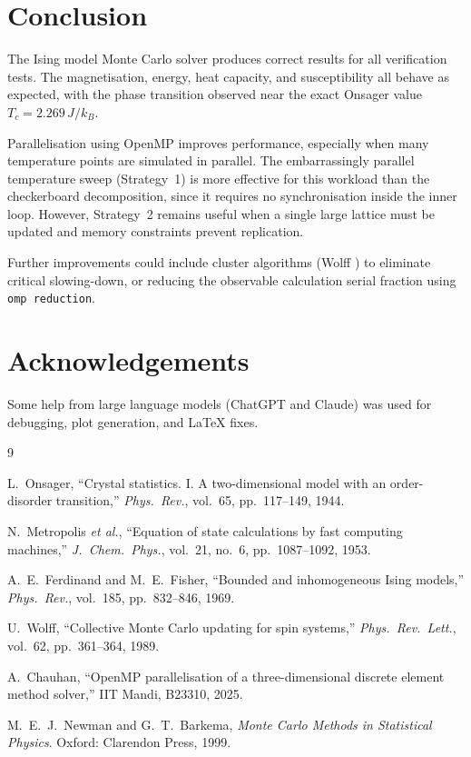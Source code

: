 \documentclass[conference]{IEEEtran}
\begin{document}
\section{Conclusion}

The Ising model Monte Carlo solver produces correct results for all
verification tests. The magnetisation, energy, heat capacity, and
susceptibility all behave as expected, with the phase transition observed
near the exact Onsager value $T_c = 2.269\,J/k_B$.

Parallelisation using OpenMP improves performance, especially when many
temperature points are simulated in parallel. The embarrassingly parallel
temperature sweep (Strategy~1) is more effective for this workload than
the checkerboard decomposition, since it requires no synchronisation inside
the inner loop. However, Strategy~2 remains useful when a single large
lattice must be updated and memory constraints prevent replication.

Further improvements could include cluster algorithms (Wolff
\cite{wolff1989}) to eliminate critical slowing-down, or reducing the
observable calculation serial fraction using \texttt{omp reduction}.

\section*{Acknowledgements}

Some help from large language models (ChatGPT and Claude) was used for
debugging, plot generation, and \LaTeX{} fixes.

\begin{thebibliography}{9}

L.~Onsager,
``Crystal statistics. I. A two-dimensional model with an order-disorder
transition,''
\emph{Phys.\ Rev.}, vol.~65, pp.~117--149, 1944.

N.~Metropolis \emph{et al.},
``Equation of state calculations by fast computing machines,''
\emph{J.\ Chem.\ Phys.}, vol.~21, no.~6, pp.~1087--1092, 1953.

A.~E.~Ferdinand and M.~E.~Fisher,
``Bounded and inhomogeneous Ising models,''
\emph{Phys.\ Rev.}, vol.~185, pp.~832--846, 1969.

U.~Wolff,
``Collective Monte Carlo updating for spin systems,''
\emph{Phys.\ Rev.\ Lett.}, vol.~62, pp.~361--364, 1989.

A.~Chauhan,
``OpenMP parallelisation of a three-dimensional discrete element method
solver,''
IIT Mandi, B23310, 2025.

M.~E.~J.~Newman and G.~T.~Barkema,
\emph{Monte Carlo Methods in Statistical Physics}.
Oxford: Clarendon Press, 1999.

\end{thebibliography}
\end{document}
